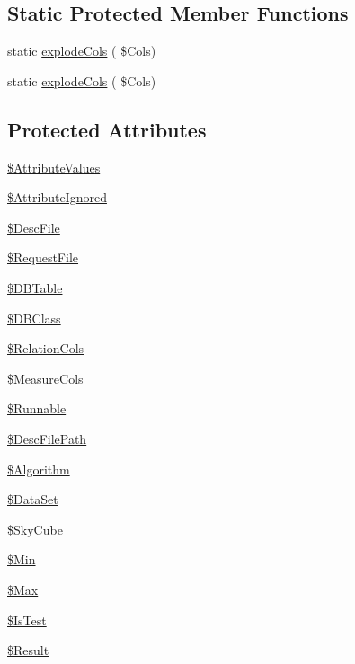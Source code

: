 \subsection*{Static Protected Member Functions}
\begin{DoxyCompactItemize}
\item 
static \hyperlink{class_analysis_a8ef8111878a5fd011b7702a8d068ca74}{explode\+Cols} ( \$Cols)
\item 
static \hyperlink{class_analysis_a8ef8111878a5fd011b7702a8d068ca74}{explode\+Cols} ( \$Cols)
\end{DoxyCompactItemize}
\subsection*{Protected Attributes}
\begin{DoxyCompactItemize}
\item 
\hyperlink{class_analysis_a13aeb9679613bef25b84b5e89dbaa4e2}{\$\+Attribute\+Values}
\item 
\hyperlink{class_analysis_a5c07dcb5adbd38700cd984652f53fc07}{\$\+Attribute\+Ignored}
\item 
\hyperlink{class_analysis_ab90a2462c848258b8e85bda884336054}{\$\+Desc\+File}
\item 
\hyperlink{class_analysis_a992082b9baf21302c8250f6acfabc374}{\$\+Request\+File}
\item 
\hyperlink{class_analysis_a7968326b530137c740a716f1dfd974e8}{\$\+D\+B\+Table}
\item 
\hyperlink{class_analysis_a7e2c61390241ce75697b16dd0b9991f1}{\$\+D\+B\+Class}
\item 
\hyperlink{class_analysis_ad8ebf9585c76924afd9b093b07769d27}{\$\+Relation\+Cols}
\item 
\hyperlink{class_analysis_ab7b9361440f8f0687bc81cdb1921bb23}{\$\+Measure\+Cols}
\item 
\hyperlink{class_analysis_a1a8e2402d71fb279a1ec6d450da83bb4}{\$\+Runnable}
\item 
\hyperlink{class_analysis_ac1b11098d5190e4ad5b74296dc777016}{\$\+Desc\+File\+Path}
\item 
\hyperlink{class_analysis_ae5c7c2c040941b6c61d89bdafa50815d}{\$\+Algorithm}
\item 
\hyperlink{class_analysis_ab6862d70e9a2732e963c99bee5d78e33}{\$\+Data\+Set}
\item 
\hyperlink{class_analysis_ae5c7b14d3d4775e505a0af0ea76703f9}{\$\+Sky\+Cube}
\item 
\hyperlink{class_analysis_ad6aa3bcc9f801610067d130849e19a19}{\$\+Min}
\item 
\hyperlink{class_analysis_a14fcd2a1856b3c25b84a26b889980401}{\$\+Max}
\item 
\hyperlink{class_analysis_a2e3524f44b8a259b3d000e3e5a905220}{\$\+Is\+Test}
\item 
\hyperlink{class_analysis_a1663bc8454674af1ec99fb834e9a805d}{\$\+Result}
\end{DoxyCompactItemize}


